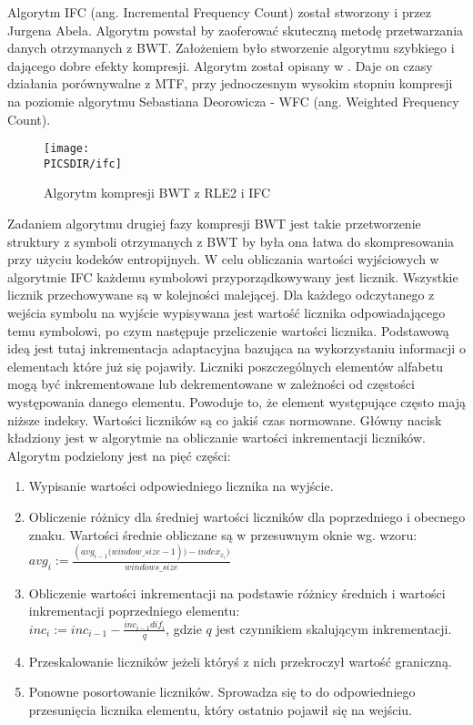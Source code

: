 
Algorytm IFC (ang. Incremental Frequency Count) został stworzony i przez Jurgena Abela. Algorytm powstał by zaoferować skuteczną metodę przetwarzania danych otrzymanych z BWT. Założeniem było stworzenie algorytmu szybkiego i dającego dobre efekty kompresji. Algorytm został opisany w \cite{abel}. Daje on czasy działania porównywalne z MTF, przy jednoczesnym wysokim stopniu kompresji na poziomie algorytmu Sebastiana Deorowicza - WFC (ang. Weighted Frequency Count)\cite{deorowicz}.  

\begin{figure}
\centering
\texttt{[image: \\PICSDIR/ifc]}
\caption{Algorytm kompresji BWT z RLE2 i IFC}
\label{rys:bwca}
\end{figure}

Zadaniem algorytmu drugiej fazy kompresji BWT jest takie przetworzenie struktury z symboli otrzymanych z BWT by była ona łatwa do skompresowania przy użyciu kodeków entropijnych. W celu obliczania wartości wyjściowych w algorytmie IFC każdemu symbolowi przyporządkowywany jest licznik. Wszystkie licznik przechowywane są w kolejności malejącej. Dla każdego odczytanego z wejścia symbolu na wyjście wypisywana jest wartość licznika odpowiadającego temu symbolowi, po czym następuje przeliczenie wartości licznika. Podstawową ideą jest tutaj inkrementacja adaptacyjna bazująca na wykorzystaniu informacji o elementach które już się pojawiły. Liczniki poszczególnych elementów alfabetu mogą być inkrementowane lub dekrementowane w zależności od częstości występowania danego elementu. Powoduje to, że element występujące często mają niższe indeksy. Wartości liczników są co jakiś czas normowane. Główny nacisk kładziony jest w algorytmie na obliczanie wartości inkrementacji liczników. Algorytm podzielony jest na pięć części:
\begin{enumerate}
\item Wypisanie wartości odpowiedniego licznika na wyjście.
\item Obliczenie różnicy dla średniej wartości liczników dla poprzedniego i obecnego znaku. Wartości średnie obliczane są w przesuwnym oknie wg. wzoru:\\
$avg_{i} := \frac{(avg_{i-1} \dot (window\_size - 1)) - index_{x_{i}})}{windows\_size}$
\item Obliczenie wartości inkrementacji na podstawie różnicy średnich i wartości inkrementacji poprzedniego elementu:\\
$inc_i := inc_{i-1} - \frac{inc_{i-1} dif_i}{q}$, gdzie $q$ jest czynnikiem skalującym inkrementacji.
\item Przeskalowanie liczników jeżeli któryś z nich przekroczył wartość graniczną.
\item Ponowne posortowanie liczników. Sprowadza się to do odpowiedniego przesunięcia licznika elementu, który ostatnio pojawił się na wejściu. 
\end{enumerate}
